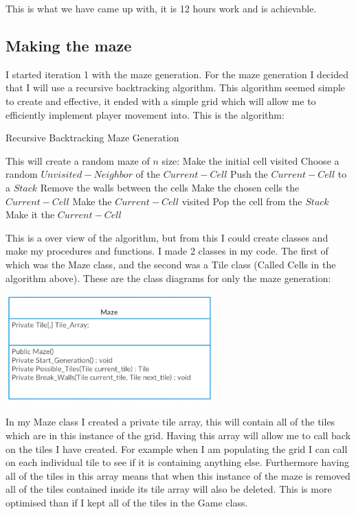 \documentclass[12pt]{article}
\begin{document}
This is what we have came up with, it is 12 hours work and is achievable. 

\subsection{Making the maze}

I started iteration 1 with the maze generation. For the maze generation I decided that I will use a recursive backtracking algorithm. This algorithm seemed simple to create and effective, it ended with a simple grid which will allow me to efficiently implement player movement into. This is the algorithm: 

\begin{algorithm}
\caption{Recursive Backtracking Maze Generation}
\begin{algorithmic}

\STATE This will create a random maze of $n$ size:
\STATE Make the initial cell visited
		\STATE Choose a random $Unvisited-Neighbor$ of the $Current-Cell$
		\STATE Push the $Current-Cell$ to a $Stack$
		\STATE Remove the walls between the cells
		\STATE Make the chosen cells the $Current-Cell$
		\STATE Make the $Current-Cell$ visited
	\ELSE
			\STATE Pop the cell from the $Stack$
			\STATE Make it the $Current-Cell$
		\ENDIF
	\ENDIF
\ENDWHILE

\end{algorithmic}
\end{algorithm}

This is a over view of the algorithm, but from this I could create classes and make my procedures and functions. I made 2 classes in my code. The first of which was the Maze class, and the second was a Tile class (Called Cells in the algorithm above). These are the class diagrams for only the maze generation:

\includegraphics[width = 0.6\textwidth]{UML_Maze_Maze-Generation}

In my Maze class I created a private tile array, this will contain all of the tiles which are in this instance of the grid. Having this array will allow me to call back on the tiles I have created. For example when I am populating the grid I can call on each individual tile to see if it is containing anything else. Furthermore having all of the tiles in this array means that when this instance of the maze is removed all of the tiles contained inside its tile array will also be deleted. This is more optimised than if I kept all of the tiles in the Game class. 
\end{document}
